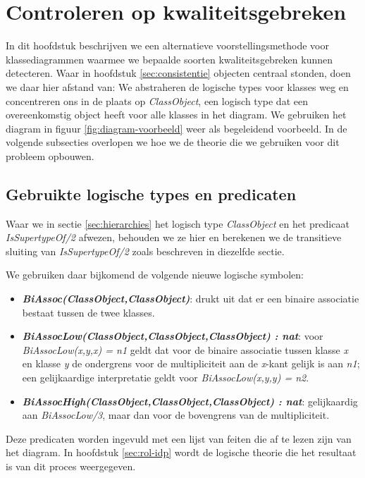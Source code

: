 \chapter{Controleren op kwaliteitsgebreken}\label{sec:kwaliteitsgebrek}
In dit hoofdstuk beschrijven we een alternatieve voorstellingsmethode voor klassediagrammen waarmee we bepaalde soorten kwaliteitsgebreken kunnen detecteren. Waar in hoofdstuk \ref{sec:consistentie} objecten centraal stonden, doen we daar hier afstand van: We abstraheren de logische types voor klasses weg en concentreren ons in de plaats op \textit{ClassObject}, een logisch type dat een overeenkomstig object heeft voor alle klasses in het diagram. We gebruiken het diagram in figuur \ref{fig:diagram-voorbeeld} weer als begeleidend voorbeeld. In de volgende subsecties overlopen we hoe we de theorie die we gebruiken voor dit probleem opbouwen.

\section{Gebruikte logische types en predicaten}
\sloppy Waar we in sectie \ref{sec:hierarchies} het logisch type \textit{ClassObject} en het predicaat \\ \textit{IsSupertypeOf/2} afwezen, behouden we ze hier en berekenen we de transitieve sluiting van \textit{IsSupertypeOf/2} zoals beschreven in diezelfde sectie.

We gebruiken daar bijkomend de volgende nieuwe logische symbolen:

\begin{itemize}
	\item \textbf{\textit{BiAssoc(ClassObject,ClassObject)}}: drukt uit dat er een binaire associatie bestaat tussen de twee klasses.
	\item \sloppy \textbf{\textit{BiAssocLow(ClassObject,ClassObject,ClassObject) : nat}}: voor \\ \textit{BiAssocLow(x,y,x) = n1} geldt dat voor de binaire associatie tussen klasse \textit{x} en klasse \textit{y} de ondergrens voor de multipliciteit aan de \textit{x}-kant gelijk is aan \textit{n1}; een gelijkaardige interpretatie geldt voor \textit{BiAssocLow(x,y,y) = n2}.
	\item \textbf{\textit{BiAssocHigh(ClassObject,ClassObject,ClassObject) : nat}}: gelijkaardig aan \textit{BiAssocLow/3}, maar dan voor de bovengrens van de multipliciteit.
\end{itemize}

Deze predicaten worden ingevuld met een lijst van feiten die af te lezen zijn van het diagram. In hoofdstuk \ref{sec:rol-idp} wordt de logische theorie die het resultaat is van dit proces weergegeven.

